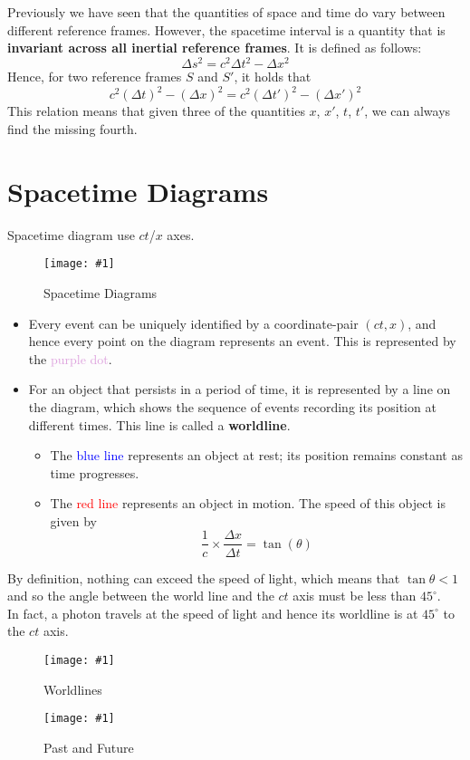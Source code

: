 \documentclass[a4paper,12pt]{article}
\let\oldsection\section
\renewcommand\section{\clearpage\oldsection}
\newcommand{\degsym}{^{\circ}}
\newcommand{\lb}{\\[8pt]}
\newcommand{\img}[4]{\begin{center}
  \begin{figure}[H]
    \centering
    \texttt{[image: \#1]}
    \caption{#3}
    \label{fig:#4}
  \end{figure}
\end{center}}
\begin{document}
Previously we have seen that the quantities of space and time do vary between different reference frames. However, the spacetime interval is a quantity that is \textbf{invariant across all inertial reference frames}. It is defined as follows:
$$
  \Delta s^2 = c^2\Delta t^2 - \Delta x^2
$$
Hence, for two reference frames $S$ and $S'$, it holds that
\begin{equation}
  c^2(\Delta t)^2 - (\Delta x)^2 = c^2(\Delta t')^2 - (\Delta x')^2
\end{equation}
This relation means that given three of the quantities $x$, $x'$, $t$, $t'$, we can always find the missing fourth.

\section{Spacetime Diagrams}

Spacetime diagram use $ct$/$x$ axes.
\img{spacetime.png}{1}{Spacetime Diagrams}{spacetime}
\begin{itemize}
  \item Every event can be uniquely identified by a coordinate-pair $(ct, x)$, and hence every point on the diagram represents an event. This is represented by the \textcolor{Plum}{purple dot}.
  \item For an object that persists in a period of time, it is represented by a line on the diagram, which shows the sequence of events recording its position at different times. This line is called a \textbf{worldline}.
        \begin{itemize}
          \item The \textcolor{blue}{blue line} represents an object at rest; its position remains constant as time progresses.
          \item The \textcolor{red}{red line} represents an object in motion. The speed of this object is given by
                $$\frac{1}{c}\times\frac{\Delta x}{\Delta t} = \tan(\theta)$$
        \end{itemize}
\end{itemize}
By definition, nothing can exceed the speed of light, which means that $\tan\theta < 1$ and so the angle between the world line and the $ct$ axis must be less than $45\degsym$.\lb
In fact, a photon travels at the speed of light and hence its worldline is at $45\degsym$ to the $ct$ axis.

\begin{minipage}{0.45\textwidth}
  \img{worldlines.png}{1}{Worldlines}{worldlines}
\end{minipage}%
\hspace*{0.1\textwidth}
\begin{minipage}{0.45\textwidth}
  \img{pastvsfuture.png}{1}{Past and Future}{pastvsfuture}
\end{minipage}
\end{document}
